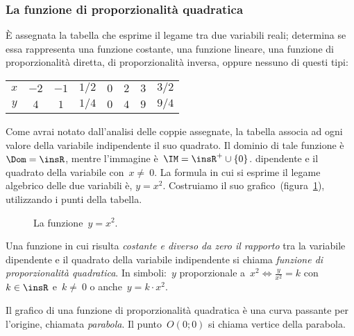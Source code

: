 
\subsubsection{La funzione di proporzionalità quadratica}

È assegnata la tabella che esprime il legame tra due variabili reali; determina 
se essa rappresenta una funzione costante,
una funzione lineare, una funzione di proporzionalità diretta, di 
proporzionalità inversa, oppure nessuno di questi tipi:
\begin{center}
 \begin{tabular}{cccccccc}
 \toprule
 $x$ & $-2$ & $-1$ & $1/2$ & $0$ & $2$& $3$ & $3/2$\\
 $y$ & $4$ & $1$ & $1/4$ & $0$ & $4$& $9$ & $9/4$\\
 \bottomrule
 \end{tabular}
\end{center}

Come avrai notato dall'analisi delle coppie assegnate, la tabella associa ad 
ogni valore della variabile indipendente il
suo quadrato.
Il dominio di tale funzione è~$\Dom=\insR$, mentre l'immagine 
è~$\IM=\insR^{+}\cup \{0\}$.
dipendente e il quadrato della variabile
con~$x\neq~0$. 
La formula in cui si esprime il legame algebrico delle due variabili è, 
$y=x^{2}$.
Costruiamo il suo grafico~(figura~\ref{fig:D.28}), utilizzando i punti della 
tabella.

\begin{inaccessibleblock}
 \begin{figure}[h]%
\centering
\caption{La funzione~$y=x^2$.}\label{fig:D.28}
\end{figure}
\end{inaccessibleblock}

\begin{definizione}
Una funzione in cui risulta \emph{costante e diverso da zero il rapporto} tra la 
variabile dipendente e il quadrato della variabile
indipendente si chiama \emph{funzione di proporzionalità quadratica}. In 
simboli:~$y$ proporzionale a~$x^{2} \Leftrightarrow
\frac{y}{x^{2}}=k$ con~$k\in \insR$ e~$k\neq~0$ o anche~$y=k\cdot x^{2}$.
\end{definizione}
Il grafico di una funzione di proporzionalità quadratica è una curva passante 
per l'origine, chiamata \emph{parabola}.
Il punto~$O(0;0)$ si chiama vertice della parabola.

